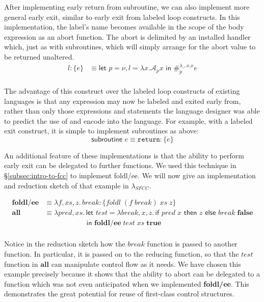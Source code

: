 \documentclass[11pt]{article}
\newcommand\x{\lambda x}
\newcommand{\letin}[2]{\textsf{let }#1\textsf{ in }#2}
\newcommand\A{\mathcal{A}}
\begin{document}
After implementing early return from  subroutine, we can also implement more general early exit, similar to early exit from labeled loop constructs.
In this implementation, the label's name becomes available in the scope of the body expression as an abort function.
The abort is delimited by an installed handler which, just as with subroutines, which will simply arrange for the abort value to be returned unaltered.
\begin{align*}
l\!: \{e\} &\equiv \letin{p = \nu, l = \x.\A_px}{\#_p^{\lambda \_,x.x}e} \\
\end{align*}

The advantage of this construct over the labeled loop constructs of existing languages is that any expression may now be labeled and exited early from, rather than only those expressions and statements the language designer was able to predict the use of and encode into the language.
For example, with a labeled exit construct, it is simple to implement subroutines as above:
$$\textsf{subroutine }e \equiv \texttt{return}\!:\{e\}$$





An additional feature of these implementations is that the ability to perform early exit can be delegated to further functions.
We used this technique in \S\ref{subsec:intro-to-fcc} to implement foldl/ee.
We will now give an implementation and reduction sketch of that example in $\lambda_{SFCC}$.

\begin{align*}
\textbf{foldl/ee} &\equiv
	\lambda f, xs, z.\,break\!: \{foldl\;(f\;break)\;xs\;z\} \\
\textbf{all} &\equiv
	\lambda pred,xs.\, \letin{test =
		\lambda break,x,z.\,\textsf{if }pred\;x
		\textsf{ then }z\textsf{ else }break\;\textbf{false}
	\\&\qquad\qquad\quad\;\;}{\textbf{foldl/ee}\;test\;xs\;\textbf{true}} \\
\end{align*}

Notice in the reduction sketch how the $break$ function is passed to another function.
In particular, it is passed on to the reducing function, so that the $test$ function in $\textbf{all}$ can manipulate control flow as it needs.
We have chosen this example precisely because it shows that the ability to abort can be delegated to a function which was not even anticipated when we implemented \textbf{foldl/ee}.
This demonstrates the great potential for reuse of first-class control structures.
\end{document}
